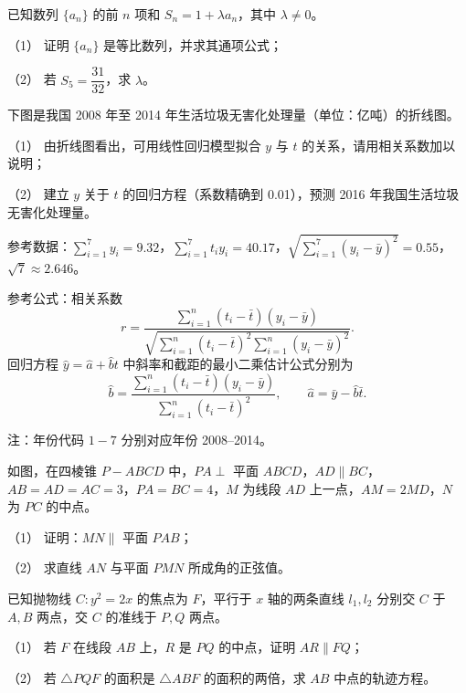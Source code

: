 \begin{question}
已知数列 \(\{a_n\}\) 的前 \(n\) 项和 \(S_n=1+\lambda a_n\)，其中 \(\lambda\ne0\)。

（1） 证明 \(\{a_n\}\) 是等比数列，并求其通项公式；

（2） 若 \(S_5=\dfrac{31}{32}\)，求 \(\lambda\)。

\Needspace{0.4\textheight}
\end{question}
\begin{question}
下图是我国 2008 年至 2014 年生活垃圾无害化处理量（单位：亿吨）的折线图。

（1） 由折线图看出，可用线性回归模型拟合 \(y\) 与 \(t\) 的关系，请用相关系数加以说明；

（2） 建立 \(y\) 关于 \(t\) 的回归方程（系数精确到 0.01），预测 2016 年我国生活垃圾无害化处理量。

参考数据：\(\displaystyle\sum_{i=1}^7 y_i=9.32\)，\(\displaystyle\sum_{i=1}^7t_i y_i=40.17\)，\(\displaystyle\sqrt{\sum_{i=1}^7(y_i-\bar y)^2}=0.55\)，\(\sqrt7\approx2.646\)。

参考公式：相关系数
\nopagebreak[4]
\[
r=\frac{\displaystyle\sum_{i=1}^n(t_i-\bar t)(y_i-\bar y)}{\sqrt{\displaystyle\sum_{i=1}^n(t_i-\bar t)^2\displaystyle\sum_{i=1}^n(y_i-\bar y)^2}}.
\]
回归方程 \(\hat y=\hat a+\hat bt\) 中斜率和截距的最小二乘估计公式分别为
\nopagebreak[4]
\[
\hat b=\frac{\displaystyle\sum_{i=1}^n(t_i-\bar t)(y_i-\bar y)}{\displaystyle\sum_{i=1}^n(t_i-\bar t)^2},\qquad \hat a=\bar y-\hat b\bar t.
\]

注：年份代码 \(1-7\) 分别对应年份 2008–2014。
\nopagebreak[4]
\begin{center}\end{center}
\nopagebreak[4]
\Needspace{0.4\textheight}
\end{question}
\begin{question}
如图，在四棱锥 \(P-ABCD\) 中，\(PA\perp\) 平面 \(ABCD\)，\(AD\parallel BC\)，\(AB=AD=AC=3\)，\(PA=BC=4\)，\(M\) 为线段 \(AD\) 上一点，\(AM=2MD\)，\(N\) 为 \(PC\) 的中点。

（1） 证明：\(MN\parallel\) 平面 \(PAB\)；

（2） 求直线 \(AN\) 与平面 \(PMN\) 所成角的正弦值。
\nopagebreak[4]
\begin{center}\end{center}
\nopagebreak[4]
\end{question}
\begin{question}
已知抛物线 \(C:y^2=2x\) 的焦点为 \(F\)，平行于 \(x\) 轴的两条直线 \(l_1,l_2\) 分别交 \(C\) 于 \(A,B\) 两点，交 \(C\) 的准线于 \(P,Q\) 两点。

（1） 若 \(F\) 在线段 \(AB\) 上，\(R\) 是 \(PQ\) 的中点，证明 \(AR\parallel FQ\)；

（2） 若 \(\triangle PQF\) 的面积是 \(\triangle ABF\) 的面积的两倍，求 \(AB\) 中点的轨迹方程。

\end{question}
